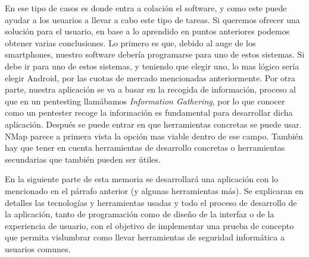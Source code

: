 En ese tipo de casos es donde entra a colación el software, y como este puede ayudar a los usuarios a llevar a cabo este tipo de tareas. Si queremos ofrecer una solución para el usuario, en base a lo aprendido en puntos anteriores podemos obtener varias conclusiones. Lo primero es que, debido al auge de los smartphones, nuestro software debería programarse para uno de estos sistemas. Si debe ir para uno de estos sistemas, y teniendo que elegir uno, lo mas lógico sería elegir Android, por las cuotas de mercado mencionadas anteriormente. Por otra parte, nuestra aplicación se va a basar en la recogida de información, proceso al que en un pentesting llamábamos \textit{Information Gathering}, por lo que conocer como un pentester recoge la información es fundamental para desarrollar dicha aplicación. Después se puede entrar en que herramientas concretas se puede usar. NMap parece a primera vista la opción mas viable dentro de ese campo. También hay que tener en cuenta herramientas de desarrollo concretas o herramientas secundarias que también pueden ser útiles.

En la siguiente parte de esta memoria se desarrollará una aplicación con lo mencionado en el párrafo anterior (y algunas herramientas más). Se explicaran en detalles las tecnologías y herramientas usadas y todo el proceso de desarrollo de la aplicación, tanto de programación como de diseño de la interfaz o de la experiencia de usuario, con el objetivo de implementar una prueba de concepto que permita vislumbrar como llevar herramientas de seguridad informática a usuarios comunes.